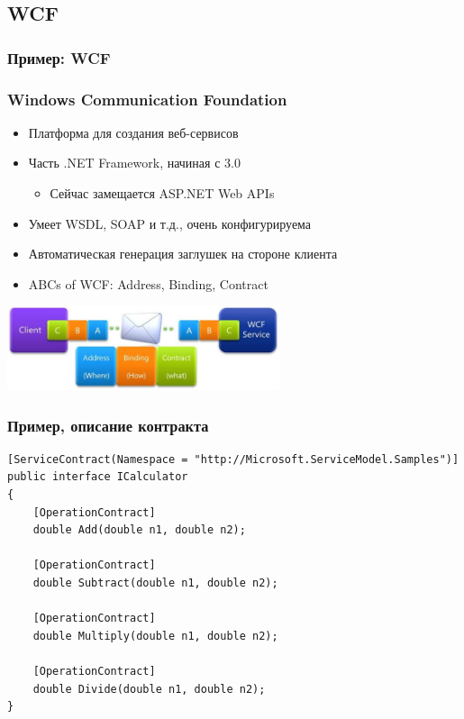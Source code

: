\documentclass{../../slides-style}
\begin{document}
    \subsection{WCF}

    \begin{frame}
        \frametitle{Пример: WCF}
        \frametitle{Windows Communication Foundation}
        \begin{itemize}
            \item Платформа для создания веб-сервисов
            \item Часть .NET Framework, начиная с 3.0
            \begin{itemize}
                \item Сейчас замещается ASP.NET Web APIs 
            \end{itemize}
            \item Умеет WSDL, SOAP и т.д., очень конфигурируема
            \item Автоматическая генерация заглушек на стороне клиента
            \item ABCs of WCF: Address, Binding, Contract
        \end{itemize}
        \begin{center}
            \includegraphics[width=0.6\textwidth]{wcf.png}
        \end{center}
    \end{frame}

    \begin{frame}[fragile]
        \frametitle{Пример, описание контракта}
        \begin{small}
            \begin{verbatim}
[ServiceContract(Namespace = "http://Microsoft.ServiceModel.Samples")]  
public interface ICalculator  
{
    [OperationContract]
    double Add(double n1, double n2);

    [OperationContract]
    double Subtract(double n1, double n2);

    [OperationContract]
    double Multiply(double n1, double n2);

    [OperationContract]
    double Divide(double n1, double n2);
}
            \end{verbatim}
        \end{small}
    \end{frame}
\end{document}
